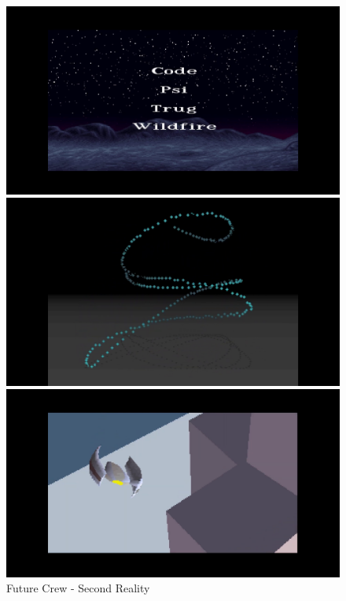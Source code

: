 \begin{figure}[h]
  \begin{minipage}[b]{0.30\linewidth}
    \centering
    \includegraphics[width=\linewidth]{images/demoscene/demos/futur1.png}
  \end{minipage}
  \hfill
  \begin{minipage}[b]{0.30\linewidth}
    \centering
    \includegraphics[width=\linewidth]{images/demoscene/demos/futur2.png}
  \end{minipage}
  \hfill
  \begin{minipage}[b]{0.30\linewidth}
    \centering
    \includegraphics[width=\linewidth]{images/demoscene/demos/futur3.png}
  \end{minipage}
  \caption{Future Crew - Second Reality}
  \label{sreal}
\end{figure}


